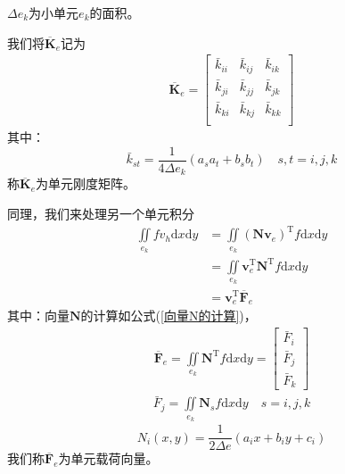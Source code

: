             $\Delta e_k$为小单元$e_k$的面积。
            \par
            我们将$\overline{\mathbf{K}}_e$记为
            \begin{align*}
                \overline{\mathbf{K}}_e =
                \begin{bmatrix}
                    \bar{k}_{ii} & \bar{k}_{ij} & \bar{k}_{ik} \\
                    \bar{k}_{ji} & \bar{k}_{jj} & \bar{k}_{jk} \\
                    \bar{k}_{ki} & \bar{k}_{kj} & \bar{k}_{kk} \\
                \end{bmatrix}
            \end{align*}
            其中：
            \[
            \bar{k}_{st} = \frac{1}{4\Delta e_k}(a_sa_t + b_sb_t) \quad s,t = i,j,k
            \]
            称$\overline{\mathbf{K}}_e$为单元刚度矩阵。
            \par
            同理，我们来处理另一个单元积分
            \begin{align*}
                \iint\limits_{e_k} f v_h \mathrm{d}x\mathrm{d}y
                &=\iint\limits_{e_k} (\mathbf{N}\mathbf{v}_e)^\mathrm{T} f\mathrm{d}x\mathrm{d}y\\
                &=\iint\limits_{e_k} \mathbf{v}_e^\mathrm{T}\mathbf{N}^\mathrm{T} f\mathrm{d}x\mathrm{d}y\\
                & = \mathbf{v}_e^\mathrm{T}\overline{\mathbf{F}}_e
            \end{align*}
            其中：向量$\mathbf{N}$的计算如公式(\ref{向量N的计算})，
            \begin{align*}
                \overline{\mathbf{F}}_e = \iint\limits_{e_k} \mathbf{N}^\mathrm{T} f\mathrm{d}x\mathrm{d}y =
                \begin{bmatrix}
                    \bar{F}_i\\\bar{F}_j\\\bar{F}_k
                \end{bmatrix}
            \end{align*}
            \begin{align*}
                \bar{F}_j = \iint\limits_{e_k} \mathbf{N}_s f\mathrm{d}x\mathrm{d}y \quad s = i,j,k
            \end{align*}
            \[
                N_i(x,y) = \frac{1}{2\Delta e} (a_ix + b_i y+c_i)
            \]
            我们称$\overline{\mathbf{F}}_e$为单元载荷向量。
